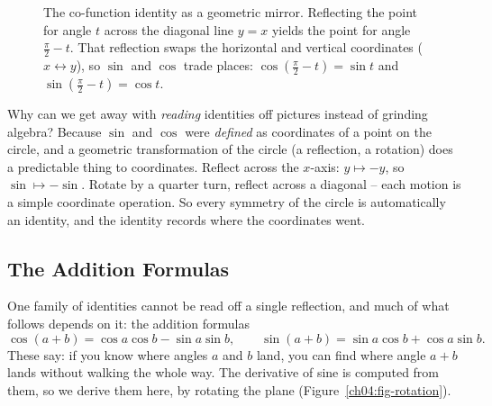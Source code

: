 \begin{figure}[htbp]
\centering
{}
\caption{The co-function identity as a geometric mirror. Reflecting the point for angle $t$ across the diagonal line $y=x$ yields the point for angle $\tfrac{\pi}{2}-t$. That reflection swaps the horizontal and vertical coordinates ($x \leftrightarrow y$), so $\sin$ and $\cos$ trade places: $\cos(\tfrac{\pi}{2}-t) = \sin t$ and $\sin(\tfrac{\pi}{2}-t) = \cos t$.}
\label{ch04:fig-cofunction}
\end{figure}

\begin{whybox}
Why can we get away with \emph{reading} identities off pictures instead of grinding algebra? Because $\sin$ and $\cos$ were \emph{defined} as coordinates of a point on the circle, and a geometric transformation of the circle (a reflection, a rotation) does a predictable thing to coordinates. Reflect across the $x$-axis: $y \mapsto -y$, so $\sin \mapsto -\sin$. Rotate by a quarter turn, reflect across a diagonal -- each motion is a simple coordinate operation. So every symmetry of the circle is automatically an identity, and the identity records where the coordinates went.
\end{whybox}

\subsection{The Addition Formulas}

One family of identities cannot be read off a single reflection, and much of what follows depends on it: the addition formulas
\[
  \cos(a+b) = \cos a\cos b - \sin a \sin b,
  \qquad
  \sin(a+b) = \sin a\cos b + \cos a\sin b.
\]
These say: if you know where angles $a$ and $b$ land, you can find where angle $a+b$ lands without walking the whole way. The derivative of sine is computed from them, so we derive them here, by rotating the plane (Figure~\ref{ch04:fig-rotation}).

